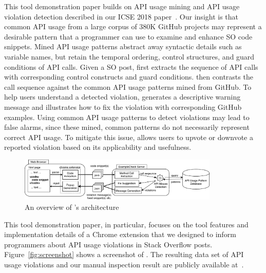 This tool demonstration paper builds on API usage mining and API usage violation detection described in our ICSE 2018 paper~\cite{zhang2018code}. Our insight is that common API usage from a large corpus of 380K GitHub projects may represent a desirable pattern that a programmer can use to examine and enhance SO code snippets. Mined API usage patterns abstract away syntactic details such as variable names, but retain the temporal ordering, control structures, and guard conditions of API calls. Given a SO post, {\tool} first extracts the sequence of API calls with corresponding control constructs and guard conditions. {\tool} then contrasts the call sequence against the common API usage patterns mined from GitHub. To help users understand a detected violation, {\tool} generates a descriptive warning message and illustrates how to fix the violation with corresponding GitHub examples. Using common API usage patterns to detect violations may lead to false alarms, since these mined, common patterns do not necessarily represent correct API usage. To mitigate this issue, {\tool} allows users to upvote or downvote a reported violation based on its applicability and usefulness. 

\begin{figure}[!th]
\centering
\includegraphics[width=0.85\textwidth]{examplecheck-extension.pdf}
\caption{An overview of {\tool}'s architecture}
\label{fig:arch}
\end{figure}

This tool demonstration paper, in particular, focuses on the tool features and implementation details of a Chrome extension that we designed to inform programmers about API usage violations in Stack Overflow posts. Figure~\ref{fig:screenshot} shows a screenshot of {\tool}. The resulting data set of API usage violations and our manual inspection result are publicly available at~. 



%

